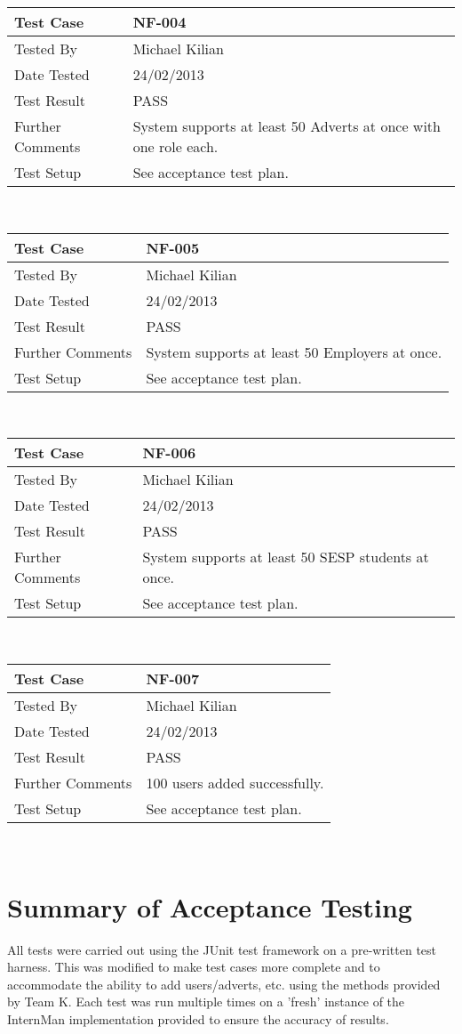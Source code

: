 \documentclass{l3deliverable}
\begin{document}
\begin{tabular}{lp{10cm}}
\hline 
\textbf{Test Case} & NF-004\tabularnewline
\hline 
\hline 
Tested By & Michael Kilian\tabularnewline
\hline 
Date Tested & 24/02/2013\tabularnewline
\hline 
Test Result & PASS\tabularnewline
\hline
Further Comments & System supports at least 50 Adverts at once with one role each.\tabularnewline
\hline
Test Setup & See acceptance test plan.\tabularnewline
\hline
\end{tabular}\\

\begin{tabular}{lp{10cm}}
\hline 
\textbf{Test Case} & NF-005\tabularnewline
\hline 
\hline 
Tested By & Michael Kilian\tabularnewline
\hline 
Date Tested & 24/02/2013\tabularnewline
\hline 
Test Result & PASS\tabularnewline
\hline
Further Comments & System supports at least 50 Employers at once.\tabularnewline
\hline
Test Setup & See acceptance test plan.\tabularnewline
\hline
\end{tabular}\\

\begin{tabular}{lp{10cm}}
\hline 
\textbf{Test Case} & NF-006\tabularnewline
\hline 
\hline 
Tested By & Michael Kilian\tabularnewline
\hline 
Date Tested & 24/02/2013\tabularnewline
\hline 
Test Result & PASS\tabularnewline
\hline
Further Comments & System supports at least 50 SESP students at once.\tabularnewline
\hline
Test Setup & See acceptance test plan.\tabularnewline
\hline
\end{tabular}\\

\begin{tabular}{lp{10cm}}
\hline 
\textbf{Test Case} & NF-007\tabularnewline
\hline 
\hline 
Tested By & Michael Kilian\tabularnewline
\hline 
Date Tested & 24/02/2013\tabularnewline
\hline 
Test Result & PASS\tabularnewline
\hline
Further Comments & 100 users added successfully.\tabularnewline
\hline
Test Setup & See acceptance test plan.\tabularnewline
\hline
\end{tabular}\\
\newpage 

\section{Summary of Acceptance Testing}
All tests were carried out using the JUnit test framework on a pre-written test harness. This was modified to make test cases more complete and to accommodate the ability to add users/adverts, etc. using the methods provided by Team K. Each test was run multiple times on a 'fresh' instance of the InternMan implementation provided to ensure the accuracy of results.\\
\end{document}
